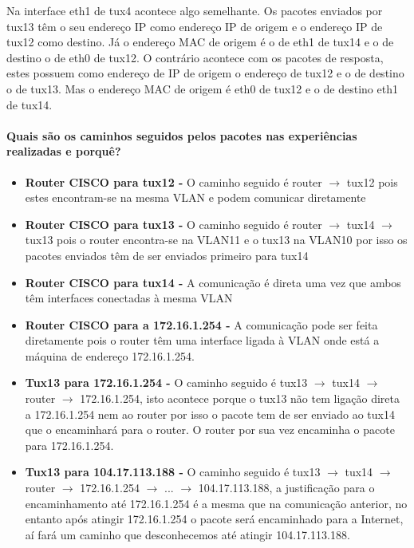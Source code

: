 Na interface eth1 de tux4 acontece algo semelhante. Os pacotes enviados por tux13 têm o seu endereço IP como endereço IP de origem e o endereço IP de tux12 como destino. Já o endereço MAC de origem é o de eth1 de tux14 e o de destino o de eth0 de tux12. O contrário acontece com os pacotes de resposta, estes possuem como endereço de IP de origem o endereço de tux12 e o de destino o de tux13. Mas o endereço MAC de origem é eth0 de tux12 e o de destino eth1 de tux14.

\paragraph{Quais são os caminhos seguidos pelos pacotes nas experiências realizadas e porquê?}

\begin{itemize}
    \item \textbf{Router CISCO para tux12 - } O caminho seguido é router $\rightarrow$ tux12 pois estes encontram-se na mesma VLAN e podem comunicar diretamente
    \item \textbf{Router CISCO para tux13 - } O caminho seguido é router $\rightarrow$ tux14 $\rightarrow$ tux13 pois o router encontra-se na VLAN11 e o tux13 na VLAN10 por isso os pacotes enviados têm de ser enviados primeiro para tux14 
    \item \textbf{Router CISCO para tux14 - } A comunicação é direta uma vez que ambos têm interfaces conectadas à mesma VLAN
    \item \textbf{Router CISCO para a 172.16.1.254 - } A comunicação pode ser feita diretamente pois o router têm uma interface ligada à VLAN onde está a máquina de endereço 172.16.1.254.
    \item \textbf{Tux13 para 172.16.1.254 - } O caminho seguido é tux13 $\rightarrow$ tux14 $\rightarrow$ router $\rightarrow$ 172.16.1.254, isto acontece porque o tux13 não tem ligação direta a 172.16.1.254 nem ao router por isso o pacote tem de ser enviado ao tux14 que o encaminhará para o router. O router por sua vez encaminha o pacote para 172.16.1.254.
    \item \textbf{Tux13 para 104.17.113.188 - } O caminho seguido é  tux13 $\rightarrow$ tux14 $\rightarrow$ router $\rightarrow$ 172.16.1.254 $\rightarrow$ ... $\rightarrow$ 104.17.113.188, a justificação para o encaminhamento até 172.16.1.254 é a mesma que na comunicação anterior, no entanto após atingir 172.16.1.254 o pacote será encaminhado para a Internet, aí fará um caminho que desconhecemos até atingir 104.17.113.188. 
\end{itemize}

 
